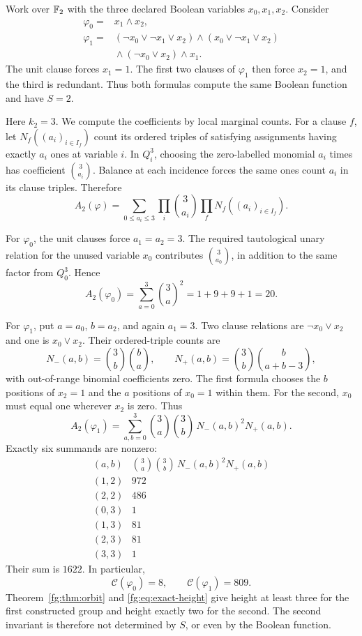 \begin{example}
\label{fg:ex:same-function}
Work over $\mathbb F_2$ with the three declared Boolean variables
$x_0,x_1,x_2$. Consider
\begin{align*}
 \varphi_0={}&x_1\wedge x_2,\\
 \varphi_1={}&(\neg x_0\vee\neg x_1\vee x_2)
 \wedge(x_0\vee\neg x_1\vee x_2)\\
 &{}\wedge(\neg x_0\vee x_2)\wedge x_1.
\end{align*}
The unit clause forces $x_1=1$. The first two clauses of $\varphi_1$
then force $x_2=1$, and the third is redundant. Thus both formulas
compute the same Boolean function and have $S=2$.

Here $k_2=3$. We compute the coefficients by local marginal counts.
For a clause $f$, let $N_f((a_i)_{i\in I_f})$ count its ordered triples
of satisfying assignments having exactly $a_i$ ones at variable $i$.
In $Q_i^3$, choosing the zero-labelled monomial $a_i$ times has
coefficient $\binom3{a_i}$. Balance at each incidence forces the same
ones count $a_i$ in its clause triples. Therefore
\[
 A_2(\varphi)=
 \sum_{0\le a_i\le3}
   \prod_i\binom3{a_i}
   \prod_fN_f((a_i)_{i\in I_f}).
\]

For $\varphi_0$, the unit clauses force $a_1=a_2=3$. The required
tautological unary relation for the unused variable $x_0$ contributes
$\binom3{a_0}$, in addition to the same factor from $Q_0^3$. Hence
\[
 A_2(\varphi_0)=\sum_{a=0}^3\binom3a^2
 =1+9+9+1=20.
\]

For $\varphi_1$, put $a=a_0$, $b=a_2$, and again $a_1=3$.
Two clause relations are $\neg x_0\vee x_2$ and one is $x_0\vee x_2$.
Their ordered-triple counts are
\[
 N_-(a,b)=\binom3b\binom ba,\qquad
 N_+(a,b)=\binom3b\binom b{a+b-3},
\]
with out-of-range binomial coefficients zero. The first formula chooses
the $b$ positions of $x_2=1$ and the $a$ positions of $x_0=1$ within
them. For the second, $x_0$ must equal one wherever $x_2$ is zero.
Thus
\[
 A_2(\varphi_1)=
 \sum_{a,b=0}^3\binom3a\binom3b\,N_-(a,b)^2N_+(a,b).
\]
Exactly six summands are nonzero:
\[
 \begin{array}{c|r}
 (a,b)&\binom3a\binom3b\,N_-(a,b)^2N_+(a,b)\\ \hline
 (1,2)&972\\
 (2,2)&486\\
 (0,3)&1\\
 (1,3)&81\\
 (2,3)&81\\
 (3,3)&1
 \end{array}
\]
Their sum is $1622$. In particular,
\[
 \mathcal C(\varphi_0)=8,\qquad
 \mathcal C(\varphi_1)=809.
\]
Theorem~\ref{fg:thm:orbit} and \eqref{fg:eq:exact-height} give height
at least three for the first constructed group and height exactly two
for the second. The second invariant is therefore not determined by
$S$, or even by the Boolean function.


\end{example}
